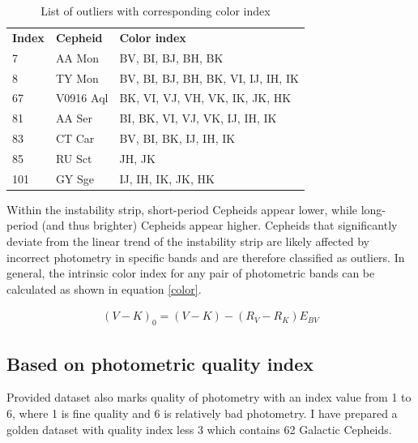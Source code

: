 \begin{table} 
  \centering
  \caption{List of outliers with corresponding color index}\label{outliers}
  {\tiny
  \begin{tabular}{lll}
    \textbf{Index} & \textbf{Cepheid}& \textbf{Color index}\\
    7 & AA Mon & BV, BI, BJ, BH, BK \\
    8 & TY Mon & BV, BI, BJ, BH, BK, VI, IJ, IH, IK\\
    67 & V0916 Aql & BK, VI, VJ, VH, VK, IK, JK, HK\\
    81 & AA Ser & BI, BK, VI, VJ, VK, IJ, IH, IK\\
    83 & CT Car & BV, BI, BK, IJ, IH, IK\\
    85 & RU Sct & JH, JK\\
    101 & GY Sge & IJ, IH, IK, JK, HK\\
 \end{tabular}
 }
\end{table}

Within the instability strip, short-period Cepheids appear lower, while long-period (and thus brighter) Cepheids appear higher. Cepheids that significantly deviate from the linear trend of the instability strip are likely affected by incorrect photometry in specific bands and are therefore classified as outliers. In general, the intrinsic color index for any pair of photometric bands can be calculated as shown in equation \ref{color}.

\begin{align}
	(V-K)_0 = (V-K) - (R_V - R_K) E_{BV}
	\label{color}
\end{align}

\subsection{Based on photometric quality index}
Provided dataset also marks quality of photometry with an index value from 1 to 6, where 1 is fine quality and 6 is relatively bad photometry. I have prepared a golden dataset with quality index less 3 which contains 62 Galactic Cepheids. 

